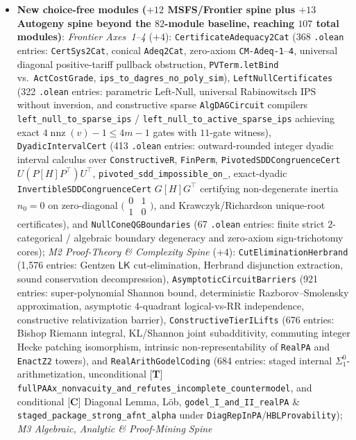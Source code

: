 \documentclass[11pt]{article}
\theoremstyle{plain}
\theoremstyle{definition}
\begin{document}
\begin{itemize}[nosep]
\item \textbf{New choice-free modules ($+12$ MSFS/Frontier spine plus $+13$ Autogeny spine beyond the $82$-module baseline, reaching $107$ total modules)}: \emph{Frontier Axes~1--4} ($+4$): \texttt{Certificate\allowbreak Adequacy2Cat} (368 \texttt{.olean} entries: \texttt{CertSys2Cat}, conical \texttt{Adeq2Cat}, zero-axiom \texttt{CM-Adeq-1}--\texttt{4}, universal diagonal positive-tariff pullback obstruction, \texttt{PVTerm.letBind} vs.\ \texttt{ActCostGrade}, \texttt{ips\_\allowbreak to\_\allowbreak dagres\_\allowbreak no\_\allowbreak poly\_\allowbreak sim}), \texttt{LeftNull\allowbreak Certificates} (322 \texttt{.olean} entries: parametric Left-Null, universal Rabinowitsch $\mathrm{IPS}$ without inversion, and constructive sparse \texttt{AlgDAGCircuit} compilers \texttt{left\_\allowbreak null\_\allowbreak to\_\allowbreak sparse\_\allowbreak ips} / \texttt{left\_\allowbreak null\_\allowbreak to\_\allowbreak active\_\allowbreak sparse\_\allowbreak ips} achieving exact $4\operatorname{nnz}(v)-1 \le 4m-1$ gates with $11$-gate witness), \texttt{Dyadic\allowbreak IntervalCert} (413 \texttt{.olean} entries: outward-rounded integer dyadic interval calculus over \texttt{ConstructiveR}, \texttt{FinPerm}, \texttt{PivotedSDDCongruenceCert} $U(P[H]P^\top)U^\top$, \texttt{pivoted\_\allowbreak sdd\_\allowbreak impossible\_\allowbreak on\_}, exact-dyadic \texttt{InvertibleSDDCongruenceCert} $G[H]G^\top$ certifying non-degenerate inertia $n_0=0$ on zero-diagonal $\bigl(\begin{smallmatrix}0&1\\1&0\end{smallmatrix}\bigr)$, and Krawczyk/Richardson unique-root certificates), and \texttt{NullCone\allowbreak QGBoundaries} (67 \texttt{.olean} entries: finite strict $2$-categorical / algebraic boundary degeneracy and zero-axiom sign-trichotomy cores); \emph{M2 Proof-Theory \& Complexity Spine} ($+4$): \texttt{CutElimination\allowbreak Herbrand} (1{,}576 entries: Gentzen $\mathsf{LK}$ cut-elimination, Herbrand disjunction extraction, sound conservation decompression), \texttt{Asymptotic\allowbreak CircuitBarriers} (921 entries: super-polynomial Shannon bound, deterministic Razborov--Smolensky approximation, asymptotic $4$-quadrant logical-vs-RR independence, constructive relativization barrier), \texttt{Constructive\allowbreak TierILifts} (676 entries: Bishop Riemann integral, $\mathrm{KL}$/Shannon joint subadditivity, commuting integer Hecke patching isomorphism, intrinsic non-representability of \texttt{RealPA} and \texttt{EnactZ2} towers), and \texttt{RealArith\allowbreak GodelCoding} (684 entries: staged internal $\Sigma^0_1$-arithmetization, unconditional \textup{[\textbf{T}]} \texttt{fullPAAx\_\allowbreak nonvacuity\_\allowbreak and\_\allowbreak refutes\_\allowbreak incomplete\_\allowbreak countermodel}, and conditional \textup{[\textbf{C}]} Diagonal Lemma, L\"ob, \texttt{godel\_\allowbreak I\_\allowbreak and\_\allowbreak II\_\allowbreak realPA} \& \texttt{staged\_\allowbreak package\_\allowbreak strong\_\allowbreak afnt\_\allowbreak alpha} under \texttt{DiagRepInPA}/\texttt{HBLProvability}); \emph{M3 Algebraic, Analytic \& Proof-Mining Spine} 
\end{itemize}
\end{document}
